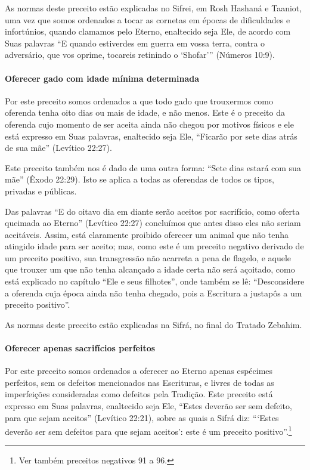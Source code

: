 As normas deste preceito estão explicadas no Sifrei, em Rosh Hashaná e
Taaniot, uma vez que somos ordenados a tocar as cornetas em épocas de
dificuldades e infortúnios, quando clamamos pelo Eterno, enaltecido
seja Ele, de acordo com Suas palavras ``E quando estiverdes em guerra
em vossa terra, contra o adversário, que vos oprime, tocareis retinindo
o `Shofar''' (Números 10:9).

\paragraph{Oferecer gado com idade mínima determinada}

Por este preceito somos ordenados a que todo gado que trouxermos como
oferenda tenha oito dias ou mais de idade, e não menos. Este é o
preceito da oferenda cujo momento de ser aceita ainda não chegou por
motivos físicos e ele está expresso em Suas palavras, enaltecido seja
Ele, ``Ficarão por sete dias atrás de sua mãe'' (Levítico 22:27).

Este preceito também nos é dado de uma outra forma: ``Sete dias estará
com sua mãe'' (Êxodo 22:29). Isto se aplica a todas as oferendas de
todos os tipos, privadas e públicas.

Das palavras ``E do oitavo dia em diante serão aceitos por sacrifício,
como oferta queimada ao Eterno'' (Levítico 22:27) concluímos que antes
disso eles não seriam aceitáveis. Assim, está claramente proibido
oferecer um animal que não tenha atingido idade para ser aceito; mas,
como este é um preceito negativo derivado de um preceito positivo, sua
transgressão não acarreta a pena de flagelo, e aquele que trouxer um que
não tenha alcançado a idade certa não será açoitado, como está explicado
no capítulo ``Ele e seus filhotes'', onde também se lê: ``Desconsidere
a oferenda cuja época ainda não tenha chegado, pois a Escritura a
justapôs a um preceito positivo''.

As normas deste preceito estão explicadas na Sifrá, no final do Tratado
Zebahim.

\paragraph{Oferecer apenas sacrifícios perfeitos}

Por este preceito somos ordenados a oferecer ao Eterno apenas espécimes
perfeitos, sem os defeitos mencionados nas Escrituras, e livres de todas
as imperfeições consideradas como defeitos pela Tradição. Este preceito
está expresso em Suas palavras, enaltecido seja Ele, ``Estes deverão ser
sem defeito, para que sejam aceitos'' (Levítico 22:21), sobre as quais a
Sifrá diz: ```Estes deverão ser sem defeitos para que sejam aceitos':
este é um preceito positivo''.\footnote{Ver também preceitos negativos 91 a 96.}

